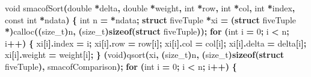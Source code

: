 \documentclass[
  12pt,
]{article}
\newenvironment{Shaded}{\begin{snugshade}}{\end{snugshade}}
\newcommand{\ControlFlowTok}[1]{\textcolor[rgb]{0.13,0.29,0.53}{\textbf{#1}}}
\newcommand{\DataTypeTok}[1]{\textcolor[rgb]{0.13,0.29,0.53}{#1}}
\newcommand{\DecValTok}[1]{\textcolor[rgb]{0.00,0.00,0.81}{#1}}
\newcommand{\KeywordTok}[1]{\textcolor[rgb]{0.13,0.29,0.53}{\textbf{#1}}}
\newcommand{\NormalTok}[1]{#1}
\newcommand{\OperatorTok}[1]{\textcolor[rgb]{0.81,0.36,0.00}{\textbf{#1}}}
\begin{document}
\begin{Shaded}
\begin{Highlighting}[]
\DataTypeTok{void}\NormalTok{ smacofSort}\OperatorTok{(}\DataTypeTok{double} \OperatorTok{*}\NormalTok{delta}\OperatorTok{,} \DataTypeTok{double} \OperatorTok{*}\NormalTok{weight}\OperatorTok{,} \DataTypeTok{int} \OperatorTok{*}\NormalTok{row}\OperatorTok{,} \DataTypeTok{int} \OperatorTok{*}\NormalTok{col}\OperatorTok{,} \DataTypeTok{int} \OperatorTok{*}\NormalTok{index}\OperatorTok{,}
                \DataTypeTok{const} \DataTypeTok{int} \OperatorTok{*}\NormalTok{ndata}\OperatorTok{)} \OperatorTok{\{}
    \DataTypeTok{int}\NormalTok{ n }\OperatorTok{=} \OperatorTok{*}\NormalTok{ndata}\OperatorTok{;}
    \KeywordTok{struct}\NormalTok{ fiveTuple }\OperatorTok{*}\NormalTok{xi }\OperatorTok{=}
        \OperatorTok{(}\KeywordTok{struct}\NormalTok{ fiveTuple }\OperatorTok{*)}\NormalTok{calloc}\OperatorTok{((}\DataTypeTok{size\_t}\OperatorTok{)}\NormalTok{n}\OperatorTok{,} \OperatorTok{(}\DataTypeTok{size\_t}\OperatorTok{)}\KeywordTok{sizeof}\OperatorTok{(}\KeywordTok{struct}\NormalTok{ fiveTuple}\OperatorTok{));}
    \ControlFlowTok{for} \OperatorTok{(}\DataTypeTok{int}\NormalTok{ i }\OperatorTok{=} \DecValTok{0}\OperatorTok{;}\NormalTok{ i }\OperatorTok{\textless{}}\NormalTok{ n}\OperatorTok{;}\NormalTok{ i}\OperatorTok{++)} \OperatorTok{\{}
\NormalTok{        xi}\OperatorTok{[}\NormalTok{i}\OperatorTok{].}\NormalTok{index }\OperatorTok{=}\NormalTok{ i}\OperatorTok{;}
\NormalTok{        xi}\OperatorTok{[}\NormalTok{i}\OperatorTok{].}\NormalTok{row }\OperatorTok{=}\NormalTok{ row}\OperatorTok{[}\NormalTok{i}\OperatorTok{];}
\NormalTok{        xi}\OperatorTok{[}\NormalTok{i}\OperatorTok{].}\NormalTok{col }\OperatorTok{=}\NormalTok{ col}\OperatorTok{[}\NormalTok{i}\OperatorTok{];}
\NormalTok{        xi}\OperatorTok{[}\NormalTok{i}\OperatorTok{].}\NormalTok{delta }\OperatorTok{=}\NormalTok{ delta}\OperatorTok{[}\NormalTok{i}\OperatorTok{];}
\NormalTok{        xi}\OperatorTok{[}\NormalTok{i}\OperatorTok{].}\NormalTok{weight }\OperatorTok{=}\NormalTok{ weight}\OperatorTok{[}\NormalTok{i}\OperatorTok{];}
    \OperatorTok{\}}
    \OperatorTok{(}\DataTypeTok{void}\OperatorTok{)}\NormalTok{qsort}\OperatorTok{(}\NormalTok{xi}\OperatorTok{,} \OperatorTok{(}\DataTypeTok{size\_t}\OperatorTok{)}\NormalTok{n}\OperatorTok{,} \OperatorTok{(}\DataTypeTok{size\_t}\OperatorTok{)}\KeywordTok{sizeof}\OperatorTok{(}\KeywordTok{struct}\NormalTok{ fiveTuple}\OperatorTok{),}
\NormalTok{                smacofComparison}\OperatorTok{);}
    \ControlFlowTok{for} \OperatorTok{(}\DataTypeTok{int}\NormalTok{ i }\OperatorTok{=} \DecValTok{0}\OperatorTok{;}\NormalTok{ i }\OperatorTok{\textless{}}\NormalTok{ n}\OperatorTok{;}\NormalTok{ i}\OperatorTok{++)} \OperatorTok{\{}

\end{Highlighting}
\end{Shaded}
\end{document}
